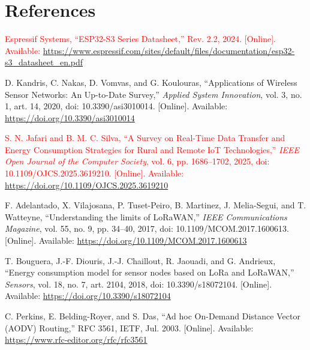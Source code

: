 \documentclass[12pt,a4paper]{article}
\DeclareRobustCommand{\changed}[1]{\textcolor{red}{#1}}
\begin{document}

\section*{References}

\begin{enumerate}[label={[\arabic*]}]
    \item \changed{Espressif Systems, ``ESP32-S3 Series Datasheet,'' Rev. 2.2, 2024. [Online]. Available: \url{https://www.espressif.com/sites/default/files/documentation/esp32-s3_datasheet_en.pdf}}

    \item D. Kandris, C. Nakas, D. Vomvas, and G. Koulouras, ``Applications of Wireless Sensor Networks: An Up-to-Date Survey,'' \textit{Applied System Innovation}, vol. 3, no. 1, art. 14, 2020, doi: 10.3390/asi3010014. [Online]. Available: \url{https://doi.org/10.3390/asi3010014}

    \item \changed{S. N. Jafari and B. M. C. Silva, ``A Survey on Real-Time Data Transfer and Energy Consumption Strategies for Rural and Remote IoT Technologies,'' \textit{IEEE Open Journal of the Computer Society}, vol. 6, pp. 1686--1702, 2025, doi: 10.1109/OJCS.2025.3619210. [Online]. Available: \url{https://doi.org/10.1109/OJCS.2025.3619210}}

    \item F. Adelantado, X. Vilajosana, P. Tuset-Peiro, B. Martinez, J. Melia-Segui, and T. Watteyne, ``Understanding the limits of LoRaWAN,'' \textit{IEEE Communications Magazine}, vol. 55, no. 9, pp. 34--40, 2017, doi: 10.1109/MCOM.2017.1600613. [Online]. Available: \url{https://doi.org/10.1109/MCOM.2017.1600613}

    \item T. Bouguera, J.-F. Diouris, J.-J. Chaillout, R. Jaouadi, and G. Andrieux, ``Energy consumption model for sensor nodes based on LoRa and LoRaWAN,'' \textit{Sensors}, vol. 18, no. 7, art. 2104, 2018, doi: 10.3390/s18072104. [Online]. Available: \url{https://doi.org/10.3390/s18072104}

    \item C. Perkins, E. Belding-Royer, and S. Das, ``Ad hoc On-Demand Distance Vector (AODV) Routing,'' RFC 3561, IETF, Jul. 2003. [Online]. Available: \url{https://www.rfc-editor.org/rfc/rfc3561}


\end{enumerate}
\end{document}
